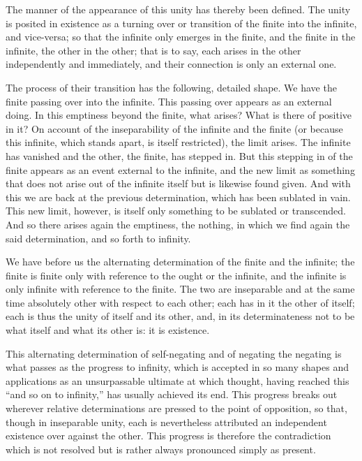 The manner of the appearance of this unity has thereby been defined.
The unity is posited in existence as a turning over
or transition of the finite into the infinite, and vice-versa;
so that the infinite only emerges in the finite,
and the finite in the infinite,
the other in the other;
that is to say, each arises in the other
independently and immediately,
and their connection is only an external one.

The process of their transition
has the following, detailed shape.
We have the finite passing over into the infinite.
This passing over appears as an external doing.
In this emptiness beyond the finite, what arises?
What is there of positive in it?
On account of the inseparability of the infinite and the finite
(or because this infinite, which stands apart, is itself restricted),
the limit arises.
The infinite has vanished and the other,
the finite, has stepped in.
But this stepping in of the finite appears
as an event external to the infinite,
and the new limit as something that does not arise
out of the infinite itself but is likewise found given.
And with this we are back at the previous determination,
which has been sublated in vain.
This new limit, however, is itself only
something to be sublated or transcended.
And so there arises again the emptiness, the nothing,
in which we find again the said determination,
and so forth to infinity.

We have before us the alternating determination
of the finite and the infinite;
the finite is finite only with reference
to the ought or the infinite,
and the infinite is only infinite with reference to the finite.
The two are inseparable and at the same time
absolutely other with respect to each other;
each has in it the other of itself;
each is thus the unity of itself and its other,
and, in its determinateness not to be
what itself and what its other is:
it is existence.

This alternating determination of self-negating
and of negating the negating is what passes
as the progress to infinity,
which is accepted in so many shapes and applications
as an unsurpassable ultimate at which thought,
having reached this “and so on to infinity,”
has usually achieved its end.
This progress breaks out wherever relative determinations are
pressed to the point of opposition, so that,
though in inseparable unity,
each is nevertheless attributed an independent existence
over against the other.
This progress is therefore the contradiction
which is not resolved but is rather always
pronounced simply as present.

